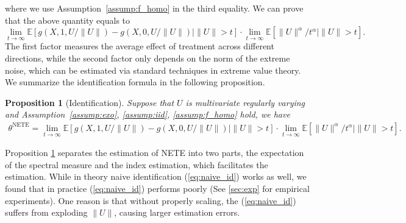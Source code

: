 \documentclass[12pt]{article}
\theoremstyle{plain}
\newtheorem{proposition}[theorem]{Proposition}
\theoremstyle{definition}
\newcommand{\tmop}[1]{\ensuremath{\operatorname{#1}}}
\begin{document}
where we use Assumption~\ref{assump:f_homo} in the third equality. We can prove that the above quantity equals to
\[ \lim_{t \rightarrow \infty} \mathbb{E}[g (X, 1, U /\|U\|) - g (X, 0, U
   /\|U\|) \mid \|U\|> t] \cdot \lim_{t \rightarrow \infty}
   \mathbb{E}[\|U\|^{\alpha} / t^{\alpha} \mid \|U\|> t] . \]
The first factor measures the average effect of treatment across different
directions, while the second factor only depends on the norm of the extreme
noise, which can be estimated via standard techniques in extreme value theory.
We summarize the identification formula in the following proposition.

\begin{proposition}
  [Identification]\label{prop:id}Suppose that $U$
  is multivariate regularly varying and Assumption~\ref{assump:exo}, \ref{assump:iid}, \ref{assump:f_homo}
  hold, we have
  \begin{align*}
    \theta^{\tmop{NETE}} = \lim_{t \rightarrow \infty} \mathbb{E}[g (X, 1, U
    /\|U\|) - g (X, 0, U /\|U\|) \mid \|U\|> t] \cdot \lim_{t \rightarrow
    \infty} \mathbb{E}[\|U\|^{\alpha} / t^{\alpha} \mid \|U\|> t] .
  \end{align*}
\end{proposition}

Proposition \ref{prop:id} separates the estimation of NETE into two parts, the expectation of the spectral measure and the index estimation, which facilitates the estimation. While in theory naive identification (\ref{eq:naive_id}) works as well, we found that in practice (\ref{eq:naive_id}) performs poorly (See \cref{sec:exp} for empirical experiments). One reason is that without properly scaling, the (\ref{eq:naive_id}) suffers from exploding $\|U\|$, causing larger estimation errors. 

\end{document}
